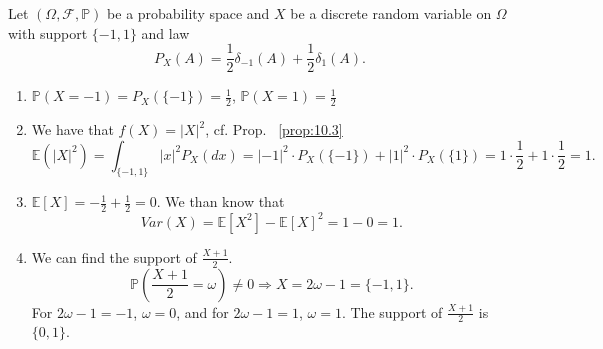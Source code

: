 \begin{exercise}[]
    \label{ex:12.2}
    Let $(\Omega, \mathcal{F}, \mathbb{P})$ be a probability space and $X$ be a discrete random variable on $\Omega$ with 
    support $\{-1,1\} $ and law
    \[
    P_X(A)= \frac{1}{2} \delta_{-1}(A)+\frac{1}{2}\delta_1(A)
    .\] 
    \begin{enumerate}[label=(\alph*)]
        \item
            $\mathbb{P}(X=-1)= P_X(\{-1\} ) = \frac{1}{2}$,
            $\mathbb{P}(X=1) = \frac{1}{2}$
        \item We have that $f(X)=|X|^{2}$, cf. Prop. ~\ref{prop:10.3}
            \[
            \mathbb{E}(|X|^{2}) = \int_{\{-1,1\} }|x|^{2}P_X(dx) = |-1|^{2} \cdot P_X(\{-1\} )+ |1|^{2}\cdot P_X(\{1\} )
            =1\cdot \frac{1}{2} + 1\cdot \frac{1}{2} =1
            .\] 
        \item $\mathbb{E}[X] = -\frac{1}{2} + \frac{1}{2}= 0$. We than know that
            \[
            Var(X) =\mathbb{E}[X^{2}] - \mathbb{E}[X]^{2} = 1-0=1
            .\] 
        \item
            We can find the support of $\frac{X+1}{2}$.
            \[
                \mathbb{P}(\frac{X+1}{2}=\omega)\neq 0 \Rightarrow X = 2\omega - 1 = \{-1,1\} 
            .\] 
            For $2\omega-1 = -1$, $\omega=0$, and for  $2\omega-1 = 1$,  $\omega=1$. The support of  $\frac{X+1}{2}$ is $\{0,1\} $.

    \end{enumerate}
\end{exercise}
